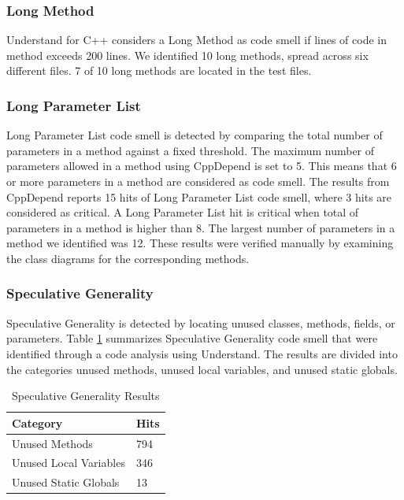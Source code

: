 \subsubsection{Long Method}
Understand for C++ considers a Long Method as code smell if lines of code in method exceeds 200 lines. We identified 10 long methods, spread across six different files. 7 of 10 long methods are located in the test files. 

\subsubsection{Long Parameter List}
Long Parameter List code smell is detected by comparing the total number of parameters in a method against a fixed threshold. The maximum number of parameters allowed in a method using CppDepend is set to 5. This means that 6 or more parameters in a method are considered as code smell. The results from CppDepend reports 15 hits of Long Parameter List code smell, where 3 hits are considered as critical. A Long Parameter List hit is critical when total of parameters in a method is higher than 8. The largest number of parameters in a method we identified was 12. These results were verified manually by examining the class diagrams for the corresponding methods.

\subsubsection{Speculative Generality}
Speculative Generality is detected by locating unused classes, methods, fields, or parameters. Table \ref{tab:speculativeGenerality} summarizes Speculative Generality code smell that were identified through a code analysis using Understand. The results are divided into the categories unused methods, unused local variables, and unused static globals. 

\begin{table}[]
\centering
\caption{Speculative Generality Results}
\label{tab:speculativeGenerality}
\begin{tabular}{|l|l|}
\hline
\textbf{Category}		& 	\textbf{Hits} \\ \hline
Unused Methods 			&	794  \\ \hline
Unused Local Variables 	& 	346	 \\ \hline
Unused Static Globals 	& 	13	 \\ \hline
\end{tabular}
\end{table}

